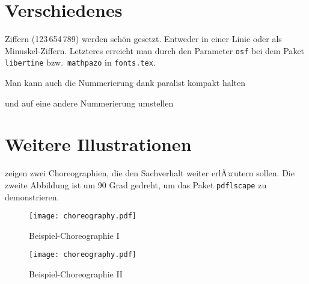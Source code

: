 \section{Verschiedenes}
\label{sec:diff}
\ifdeutsch
  Ziffern (123\,654\,789) werden schön gesetzt.
  Entweder in einer Linie oder als Minuskel-Ziffern.
  Letzteres erreicht man durch den Parameter \texttt{osf} bei dem Paket \texttt{libertine} bzw.\ \texttt{mathpazo} in \texttt{fonts.tex}.
\fi

\begin{compactenum}[I.]
  \item Man kann auch die Nummerierung dank paralist kompakt halten
  \item und auf eine andere Nummerierung umstellen
\end{compactenum}

\section{Weitere Illustrationen}
 zeigen zwei Choreographien, die den Sachverhalt weiter erlÃ¤utern sollen.
Die zweite Abbildung ist um 90 Grad gedreht, um das Paket \texttt{pdflscape} zu demonstrieren.

\begin{figure}
  \centering
  \texttt{[image: choreography.pdf]}
  \caption{Beispiel-Choreographie I}
  \label{fig:AnhangsChor}
\end{figure}

\begin{landscape}
  \begin{figure}
    \centering
    \texttt{[image: choreography.pdf]}
    \caption{Beispiel-Choreographie II}
    \label{fig:AnhangsChor2}
  \end{figure}
\end{landscape}

